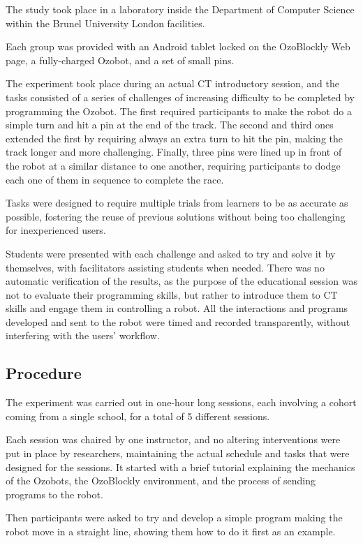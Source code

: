 The study took place in a laboratory inside the Department of Computer Science within the Brunel University London facilities.

Each group was provided with an Android tablet locked on the OzoBlockly Web page, a fully-charged Ozobot, and a set of small pins.

The experiment took place during an actual \ac{CT} introductory session, and the tasks consisted of a series of challenges of increasing difficulty to be completed by programming the Ozobot. The first required participants to make the robot do a simple turn and hit a pin at the end of the track. The second and third ones extended the first by requiring always an extra turn to hit the pin, making the track longer and more challenging. Finally, three pins were lined up in front of the robot at a similar distance to one another, requiring participants to dodge each one of them in sequence to complete the race.

Tasks were designed to require multiple trials from learners to be as accurate as possible, fostering the reuse of previous solutions without being too challenging for inexperienced users.

Students were presented with each challenge and asked to try and solve it by themselves, with facilitators assisting students when needed. There was no automatic verification of the results, as the purpose of the educational session was not to evaluate their programming skills, but rather to introduce them to \ac{CT} skills and engage them in controlling a robot. All the interactions and programs developed and sent to the robot were timed and recorded transparently, without interfering with the users' workflow.

\subsection{Procedure}
The experiment was carried out in one-hour long sessions, each involving a cohort coming from a single school, for a total of 5 different sessions.

Each session was chaired by one instructor, and no altering interventions were put in place by researchers, maintaining the actual schedule and tasks that were designed for the sessions. It started with a brief tutorial explaining the mechanics of the Ozobots, the OzoBlockly environment, and the process of sending programs to the robot.

Then participants were asked to try and develop a simple program making the robot move in a straight line, showing them how to do it first as an example.

